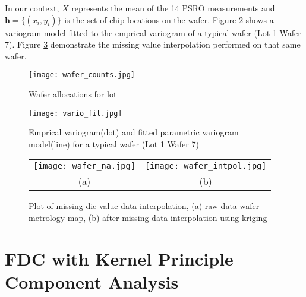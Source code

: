 \documentclass[english]{article}
\numberwithin{equation}{section}
\numberwithin{table}{section}
\numberwithin{figure}{section}
\newcommand{\bmh}{\bm{h}}
\newlength{\fwtwo} \setlength{\fwtwo}{0.48\textwidth}
\begin{document}
In our context, $X$ represents the mean of the 14 PSRO measurements
and $\bmh = \{ (x_i, y_i) \}$ is the set of chip locations on the wafer.
Figure \ref{vario_fit} shows a variogram model fitted to the
emprical variogram of a typical wafer (Lot 1 Wafer 7). Figure
\ref{wafer_fill} demonstrate the missing value interpolation performed
on that same wafer.

\begin{figure} \centering
  \texttt{[image: wafer\_counts.jpg]}
  \tiny \caption{Wafer allocations for lot}
  \label{wafer_counts}
\end{figure}

\begin{figure} \centering
  \texttt{[image: vario\_fit.jpg]}
  \tiny \caption{Emprical variogram(dot) and fitted parametric 
  variogram model(line) for a typical wafer (Lot 1 Wafer 7)}
  \label{vario_fit}
\end{figure}

\begin{figure} \centering
  \begin{tabular}{cc}
    \texttt{[image: wafer\_na.jpg]} &
    \texttt{[image: wafer\_intpol.jpg]} \\
    (a) & (b)
  \end{tabular}
  \caption{Plot of missing die value data interpolation,
  (a) raw data wafer metrology map, (b) after missing data
  interpolation using kriging}
  \label{wafer_fill}
\end{figure}




\section{FDC with Kernel Principle Component Analysis} \label{kernel}
\end{document}
